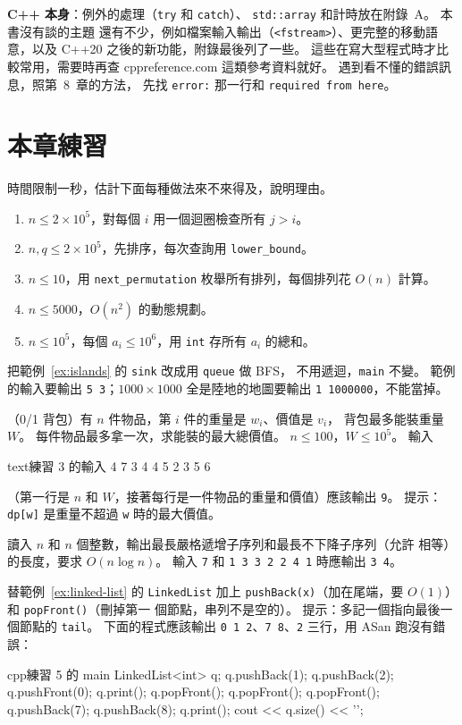 \textbf{C++ 本身}：例外的處理（\texttt{try} 和 \texttt{catch}）、
\texttt{std::array} 和計時放在附錄~A。 本書沒有談的主題
還有不少，例如檔案輸入輸出（\texttt{<fstream>}）、更完整的移動語意，以及
C++20 之後的新功能，附錄最後列了一些。 這些在寫大型程式時才比較常用，需要時再查
cppreference.com 這類參考資料就好。 遇到看不懂的錯誤訊息，照第~8~章的方法，
先找 \texttt{error:} 那一行和 \texttt{required from here}。

\section{本章練習}
\label{sec:ch10-exercises}

\begin{drills}[label=drills:ch10]
\item 時間限制一秒，估計下面每種做法來不來得及，說明理由。
\begin{enumerate}
\item $n \le 2 \times 10^5$，對每個 $i$ 用一個迴圈檢查所有 $j > i$。
\item $n, q \le 2 \times 10^5$，先排序，每次查詢用 \texttt{lower\_bound}。
\item $n \le 10$，用 \texttt{next\_permutation} 枚舉所有排列，每個排列花
$O(n)$ 計算。
\item $n \le 5000$，$O(n^2)$ 的動態規劃。
\item $n \le 10^5$，每個 $a_i \le 10^6$，用 \texttt{int} 存所有 $a_i$ 的總和。
\end{enumerate}
\item 把範例~\ref{ex:islands} 的 \texttt{sink} 改成用 \texttt{queue} 做 BFS，
不用遞迴，\texttt{main} 不變。 範例的輸入要輸出 \texttt{5 3}；$1000 \times
1000$ 全是陸地的地圖要輸出 \texttt{1 1000000}，不能當掉。
\item （0/1 背包）有 $n$ 件物品，第 $i$ 件的重量是 $w_i$、價值是 $v_i$，
背包最多能裝重量 $W$。 每件物品最多拿一次，求能裝的最大總價值。
$n \le 100$，$W \le 10^5$。 輸入
\begin{code}{text}{練習 3 的輸入}
4 7
3 4
4 5
2 3
5 6
\end{code}
（第一行是 $n$ 和 $W$，接著每行是一件物品的重量和價值）應該輸出 \texttt{9}。
提示：\texttt{dp[w]} 是重量不超過 \texttt{w} 時的最大價值。
\item 讀入 $n$ 和 $n$ 個整數，輸出最長嚴格遞增子序列和最長不下降子序列（允許
相等）的長度，要求 $O(n \log n)$。 輸入 \texttt{7} 和
\texttt{1 3 3 2 2 4 1} 時應輸出 \texttt{3 4}。
\item 替範例~\ref{ex:linked-list} 的 \texttt{LinkedList} 加上
\texttt{pushBack(x)}（加在尾端，要 $O(1)$）和 \texttt{popFront()}（刪掉第一
個節點，串列不是空的）。 提示：多記一個指向最後一個節點的 \texttt{tail}。
下面的程式應該輸出 \texttt{0 1 2}、\texttt{7 8}、\texttt{2} 三行，用 ASan
跑沒有錯誤：
\begin{code}{cpp}{練習 5 的 main}
LinkedList<int> q;
q.pushBack(1);
q.pushBack(2);
q.pushFront(0);
q.print();
q.popFront();
q.popFront();
q.popFront();
q.pushBack(7);
q.pushBack(8);
q.print();
cout << q.size() << '\n';
\end{code}
\end{drills}

